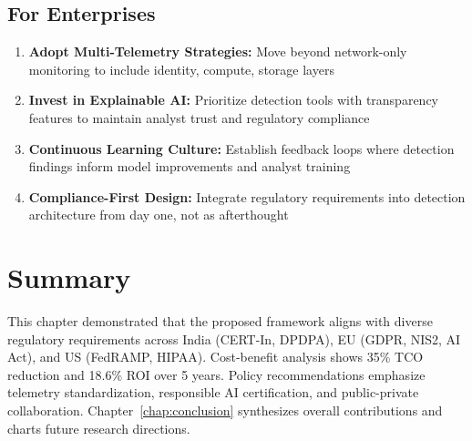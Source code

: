 \subsection{For Enterprises}
\begin{enumerate}
    \item \textbf{Adopt Multi-Telemetry Strategies:} Move beyond network-only monitoring to include identity, compute, storage layers
    \item \textbf{Invest in Explainable AI:} Prioritize detection tools with transparency features to maintain analyst trust and regulatory compliance
    \item \textbf{Continuous Learning Culture:} Establish feedback loops where detection findings inform model improvements and analyst training
    \item \textbf{Compliance-First Design:} Integrate regulatory requirements into detection architecture from day one, not as afterthought
\end{enumerate}

\section{Summary}
This chapter demonstrated that the proposed framework aligns with diverse regulatory requirements across India (CERT-In, DPDPA), EU (GDPR, NIS2, AI Act), and US (FedRAMP, HIPAA). Cost-benefit analysis shows 35\% TCO reduction and 18.6\% ROI over 5 years. Policy recommendations emphasize telemetry standardization, responsible AI certification, and public-private collaboration. Chapter~\ref{chap:conclusion} synthesizes overall contributions and charts future research directions.
